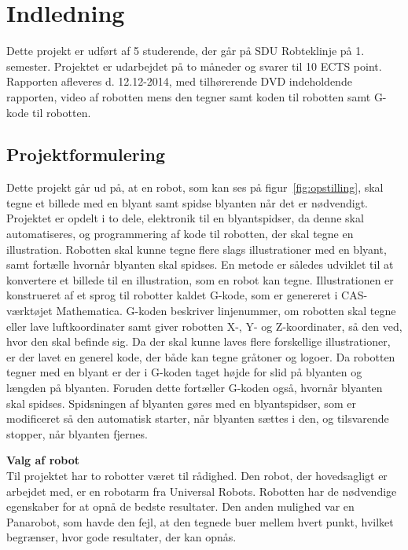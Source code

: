 \section{Indledning}
Dette projekt er udført af 5 studerende, der går på SDU Robteklinje på 1. semester. Projektet er udarbejdet på to måneder og svarer til 10 ECTS point. Rapporten afleveres d. 12.12-2014, med tilhørerende DVD indeholdende rapporten, video af robotten mens den tegner samt koden til robotten samt G-kode til robotten.
 

\subsection{Projektformulering}
Dette projekt går ud på, at en robot, som kan ses på figur~\ref{fig:opstilling}, skal tegne et billede med en blyant samt spidse blyanten når det er nødvendigt. 
Projektet er opdelt i to dele, elektronik til en blyantspidser, da denne skal automatiseres, og programmering af kode til robotten, der skal tegne en illustration. 
Robotten skal kunne tegne flere slags illustrationer med en blyant, samt fortælle hvornår blyanten skal spidses.  En metode er således udviklet til at konvertere et billede til en illustration, som en robot kan tegne.  Illustrationen er konstrueret af et sprog til robotter kaldet G-kode, som er genereret i CAS-værktøjet Mathematica. G-koden beskriver linjenummer, om robotten skal tegne eller lave luftkoordinater samt giver robotten X-, Y- og Z-koordinater, så den ved, hvor den skal befinde sig. Da der skal kunne laves flere forskellige illustrationer, er der lavet en generel kode, der både kan tegne gråtoner og logoer. Da robotten tegner med en blyant er der i G-koden taget højde for slid på blyanten og længden på blyanten. Foruden dette fortæller G-koden også, hvornår blyanten skal spidses. 
Spidsningen af blyanten gøres med en blyantspidser, som er modificeret så den automatisk starter, når blyanten sættes i den, og tilsvarende stopper, når blyanten fjernes. \linebreak

\textbf{Valg af robot}\\

Til projektet har to robotter været til rådighed. Den robot, der hovedsagligt er arbejdet med, er en robotarm fra Universal Robots. Robotten har de nødvendige egenskaber for at opnå de bedste resultater. Den anden mulighed var en Panarobot, som havde den fejl, at den tegnede buer mellem hvert punkt, hvilket begrænser, hvor gode resultater, der kan opnås.

